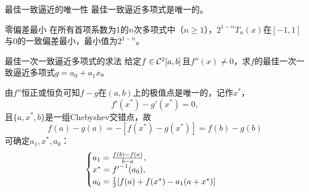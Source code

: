 \begin{theorem}
    {最佳一致逼近的唯一性}{}
    最佳一致逼近多项式是唯一的。
\end{theorem}

\begin{theorem}
    {零偏差最小}{}
    在所有首项系数为1的$n$次多项式中（$n \geq 1$），$2^{1-n}T_n(x)$在$[-1,1]$与0的一致偏差最小，最小值为$2^{1-n}$。
\end{theorem}

\begin{example}
    {最佳一次一致逼近多项式的求法}{}
    给定$f \in \mathcal{C}^2[a,b]$且$f''(x) \neq 0$，求$f$的最佳一次一致逼近多项式$g = a_0 + a_1x$。

    由$f''$恒正或恒负可知$f - g$在$(a,b)$上的极值点是唯一的，记作$x^*$，
    \[
        f'(x^*) - g'(x^*) = 0,
    \]
    且$\{a,x^*,b\}$是一组Chebyshev交错点，故
    \[
        f(a) - g(a) = -[f(x^*) - g(x^*)] = f(b) - g(b)
    \]
    可确定$a_1,x^*,a_0$：
    \begin{equation}\label{eq:na-best-linear-uniform-approximation}
        \begin{cases}
            a_1 = \frac{f(b) - f(a)}{b - a},\\
            x^* = {f'}^{-1}(a_0),\\
            a_0 = \frac12[f(a) + f(x^*) - a_1(a + x^*)]
        \end{cases}
    \end{equation}
\end{example}
